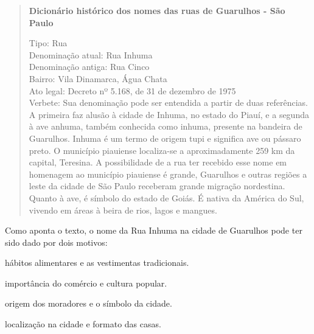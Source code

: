 \begin{quote}
\textbf{Dicionário histórico dos nomes das ruas de Guarulhos - São Paulo}

Tipo: Rua\\
Denominação atual: Rua Inhuma\\
Denominação antiga: Rua Cinco\\
Bairro: Vila Dinamarca, Água Chata\\
Ato legal: Decreto nº 5.168, de 31 de dezembro de 1975\\
Verbete: Sua denominação pode ser entendida a partir de duas
referências. A primeira faz alusão à cidade de Inhuma, no estado do
Piauí, e a segunda à ave anhuma, também conhecida como inhuma, presente
na bandeira de Guarulhos. Inhuma é um termo de origem tupi e significa
ave ou pássaro preto. O município piauiense localiza-se a
aproximadamente 259 km da capital, Teresina. A possibilidade de a rua
ter recebido esse nome em homenagem ao município piauiense é grande,
Guarulhos e outras regiões a leste da cidade de São Paulo receberam
grande migração nordestina. Quanto à ave, é símbolo do estado de Goiás.
É nativa da América do Sul, vivendo em áreas à beira de rios, lagos e
mangues.

\end{quote}

Como aponta o texto, o nome da Rua Inhuma na cidade de Guarulhos pode
ter sido dado por dois motivos:

\begin{escolha}
\item hábitos alimentares e as vestimentas tradicionais.

\item importância do comércio e cultura popular.

\item origem dos moradores e o símbolo da cidade.

\item localização na cidade e formato das casas.
\end{escolha}


